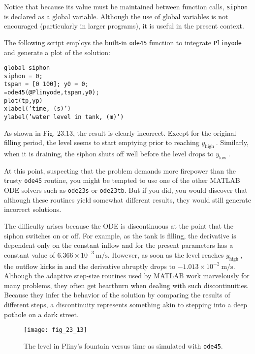 \documentclass[../main.tex]{subfiles}
\begin{document}
\noindent Notice that because its value must be maintained between function calls, \texttt{siphon} is declared as a global variable. Although the use of global variables is not encouraged (particularly in larger programs), it is useful in the present context.

The following script employs the built-in \texttt{ode45} function to integrate \texttt{Plinyode} and
generate a plot of the solution:

\texttt{global siphon\\
\indent siphon = 0;\\
\indent tspan = [0 100]; y0 = 0;\\
\indent [tp,yp]=ode45(@Plinyode,tspan,y0);\\
\indent plot(tp,yp)\\
\indent xlabel('time, (s)')\\
\indent ylabel('water level in tank, (m)')}

As shown in Fig. 23.13, the result is clearly incorrect. Except for the original filling period, the level seems to start emptying prior to reaching $y_{\text {high }}$. Similarly, when it is draining, the siphon shuts off well before the level drops to $y_{\text {low }}$.

At this point, suspecting that the problem demands more firepower than the trusty \texttt{ode45} routine, you might be tempted to use one of the other MATLAB ODE solvers such as \texttt{ode23s} or \texttt{ode23tb}. But if you did, you would discover that although these routines yield somewhat different results, they would still generate incorrect solutions.

The difficulty arises because the ODE is discontinuous at the point that the siphon switches on or off. For example, as the tank is filling, the derivative is dependent only on the constant inflow and for the present parameters has a constant value of $6.366 \times 10^{-3} \mathrm{~m} / \mathrm{s}$.
However, as soon as the level reaches $y_{\text {high }}$, the outflow kicks in and the derivative abruptly drops to $-1.013 \times 10^{-2} \mathrm{~m} / \mathrm{s}$. Although the adaptive step-size routines used by MATLAB work marvelously for many problems, they often get heartburn when dealing with such discontinuities. Because they infer the behavior of the solution by comparing the results of different steps, a discontinuity represents something akin to stepping into a deep pothole on a dark street.

\begin{figure}[H]
    \centering
    \texttt{[image: fig\_23\_13]}
   \caption{\textsf{The level in Pliny's fountain versus time as simulated with \texttt{ode45}.}}\label{fig:fig_23_13}
\end{figure}
\end{document}
